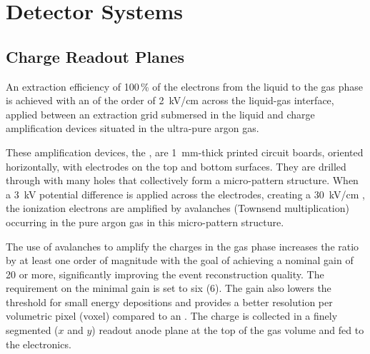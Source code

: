 \begin{comment}
\begin{itemize}
\item \dword{crp}, including extraction grid, \dword{lem}, and anode and readout planes (\dword{dp} consortium);
\item Analog and digital electronics and \dword{sftchimney} (\dword{dp} consortium); 
\item \dword{pds} (\dword{dp} consortium);
\item Cathode, \dword{fc}, and \dword{hv} system (joint \dword{sp}-\dword{dp} consortium);  
\item Slow-control (joint \dword{sp}-\dword{dp} consortium); 
\item Back-end \dword{daq} system (joint \dword{sp}-\dword{dp} consortium).
\end{itemize}
\end{comment}

\section{Detector Systems}
\label{sec:dp-execsum-systems}

\subsection{Charge Readout Planes}
\label{sec:dp-execsum-crp}

An extraction efficiency of \num{100}\,\% of the electrons from the liquid to the gas phase is achieved with an \efield of the order of \SI{2}{kV/cm} across the liquid-gas interface, applied between an  extraction grid submersed in the liquid and charge amplification  devices situated in the ultra-pure argon gas. 

These amplification devices, the , are  \SI{1}{mm}-thick printed  circuit boards,  oriented horizontally, with electrodes on the top and bottom surfaces. They are drilled through with many holes that collectively form a micro-pattern structure. When a \SI{3}{kV} potential difference is applied across the electrodes, creating a \SI{30}{kV/cm} \efield, the ionization electrons are amplified by avalanches (Townsend multiplication) occurring in the  pure argon gas in this micro-pattern structure.

The use of avalanches to amplify the charges in the gas phase increases the  ratio by at least one order of magnitude with the goal of achieving a nominal gain of 20 or more, significantly improving the event reconstruction quality. The requirement on the minimal  gain is set to six (6).  The gain also lowers the threshold for small energy depositions and provides a better resolution per volumetric pixel (voxel) compared to an  .  The charge is collected in a finely segmented \twod ($x$ and $y$) readout anode plane at the top of the gas volume and fed to the  electronics.   

